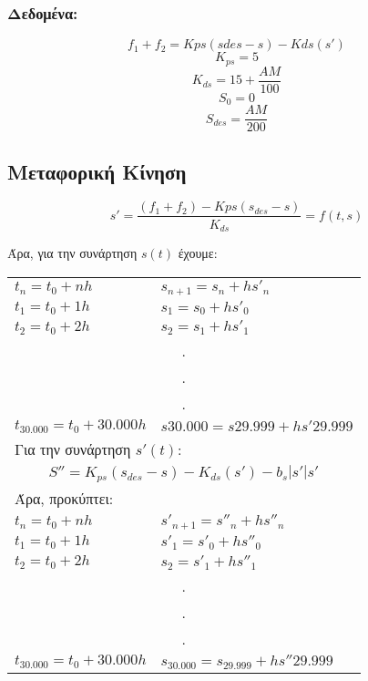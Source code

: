 \documentclass[a4paper]{article}
\begin{document}
        \subsubsection{Δεδομένα:}
            \[f_1 + f_2 = Kps (sdes - s) - Kds (s')\]
            \[K_{ps} = 5\]
            \[K_{ds} = 15 + \frac{AM}{100}\]
            \[S_0 =0\]
            \[S_{des} = \frac{AM}{200}\]

        \subsection{Μεταφορική Κίνηση}
        \[s' =  \frac{ (f_1 + f_2 ) - Kps (s_{des} - s)}{ K_{ds} } = f(t,s)\]

        Άρα, για την συνάρτηση $s(t)$ έχουμε:
        
        \begin{tabular}{ll}
            $t_n = t_0 + nh$		&			$s_{n+1} = s_n  + hs'_n$ \\
            $t_1 = t_0  + 1h$			&		   $s_1    = s_0  + hs'_0$ \\
            $t_2 = t_0  + 2h$			&		   $s_2    = s_1  + hs'_1$ \\
            \multicolumn{2}{c}{.}\\
            \multicolumn{2}{c}{.}\\
            \multicolumn{2}{c}{.}\\
            $t_{30.000} = t_0 + 30.000h$&			    $s30.000 = s29.999 + hs'29.999$\\
            \multicolumn{2}{l}{Για την συνάρτηση $s'(t)$:}\\
            \multicolumn{2}{c}{$S''	= K_{ps}(s_{des} - s) - K_{ds}(s') - b_s|s'|s'$}\\
            \multicolumn{2}{l}{Άρα, προκύπτει:}\\
            $t_n = t_0 + nh$		&			$s'_{n+1} = s''_n  + hs''_n$\\
            $t_1 = t_0  + 1h$			&		   $s'_1    = s'_0  + hs''_0$\\
            $t_2 = t_0  + 2h$			&		   $s_2    = s'_1  + hs''_1$\\
            \multicolumn{2}{c}{.}\\
            \multicolumn{2}{c}{.}\\
            \multicolumn{2}{c}{.}\\
            $t_{30.000} = t_0 + 30.000h$&			   $s_{30.000} = s_{29.999} + hs''29.999$
        \end{tabular}
\end{document}
